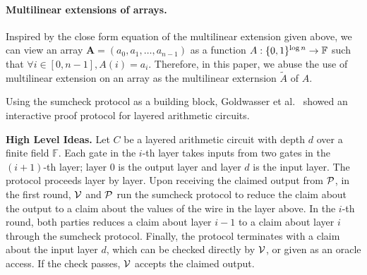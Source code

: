 \paragraph{Multilinear extensions of arrays.} Inspired by the close form equation of the multilinear extension given above, we can view an array $\textbf{A} = (a_0, a_1, \ldots, a_{n-1})$ as a function $A: \binary^{\log n}\rightarrow \F$ such that $\forall i\in[0,n-1], A(i) = a_i$. Therefore, in this paper, we abuse the use of multilinear extension on an array as the multilinear externsion $\tilde{A}$ of $A$.    

Using the sumcheck protocol as a building block, Goldwasser et al.~\cite{GKR} showed an interactive proof protocol for layered arithmetic circuits. 

\smallskip\noindent\textbf{High Level Ideas.} Let $C$ be a layered arithmetic circuit with depth $d$ over a finite field $\mathbb{F}$. Each gate in the $i$-th layer takes inputs from two gates in the $(i+1)$-th layer; layer $0$ is the output layer and layer $d$ is the input layer. The protocol proceeds layer by layer. Upon receiving the claimed output from $\P$, in the first round, $\V$ and $\P$ run the sumcheck protocol to reduce the claim about the output to a claim about the values of the wire in the layer above. In the $i$-th round, both parties reduces a claim about layer $i-1$ to a claim about layer $i$ through the sumcheck protocol. Finally, the protocol terminates with a claim about the input layer $d$, which can be checked directly by $\V$, or given as an oracle access. If the check passes, $\V$ accepts the claimed output. 

